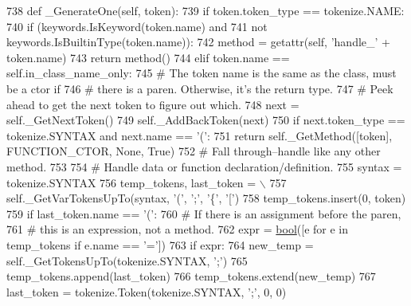 \begin{DoxyCode}
738     \textcolor{keyword}{def }\_GenerateOne(self, token):
739         \textcolor{keywordflow}{if} token.token\_type == tokenize.NAME:
740             \textcolor{keywordflow}{if} (keywords.IsKeyword(token.name) \textcolor{keywordflow}{and}
741                 \textcolor{keywordflow}{not} keywords.IsBuiltinType(token.name)):
742                 method = getattr(self, \textcolor{stringliteral}{'handle\_'} + token.name)
743                 \textcolor{keywordflow}{return} method()
744             \textcolor{keywordflow}{elif} token.name == self.in\_class\_name\_only:
745                 \textcolor{comment}{# The token name is the same as the class, must be a ctor if}
746                 \textcolor{comment}{# there is a paren.  Otherwise, it's the return type.}
747                 \textcolor{comment}{# Peek ahead to get the next token to figure out which.}
748                 next = self.\_GetNextToken()
749                 self.\_AddBackToken(next)
750                 \textcolor{keywordflow}{if} next.token\_type == tokenize.SYNTAX \textcolor{keywordflow}{and} next.name == \textcolor{stringliteral}{'('}:
751                     \textcolor{keywordflow}{return} self.\_GetMethod([token], FUNCTION\_CTOR, \textcolor{keywordtype}{None}, \textcolor{keyword}{True})
752                 \textcolor{comment}{# Fall through--handle like any other method.}
753 
754             \textcolor{comment}{# Handle data or function declaration/definition.}
755             syntax = tokenize.SYNTAX
756             temp\_tokens, last\_token = \(\backslash\)
757                 self.\_GetVarTokensUpTo(syntax, \textcolor{stringliteral}{'('}, \textcolor{stringliteral}{';'}, \textcolor{stringliteral}{'\{'}, \textcolor{stringliteral}{'['})
758             temp\_tokens.insert(0, token)
759             \textcolor{keywordflow}{if} last\_token.name == \textcolor{stringliteral}{'('}:
760                 \textcolor{comment}{# If there is an assignment before the paren,}
761                 \textcolor{comment}{# this is an expression, not a method.}
762                 expr = \hyperlink{classbool}{bool}([e \textcolor{keywordflow}{for} e \textcolor{keywordflow}{in} temp\_tokens \textcolor{keywordflow}{if} e.name == \textcolor{stringliteral}{'='}])
763                 \textcolor{keywordflow}{if} expr:
764                     new\_temp = self.\_GetTokensUpTo(tokenize.SYNTAX, \textcolor{stringliteral}{';'})
765                     temp\_tokens.append(last\_token)
766                     temp\_tokens.extend(new\_temp)
767                     last\_token = tokenize.Token(tokenize.SYNTAX, \textcolor{stringliteral}{';'}, 0, 0)

\end{DoxyCode}
